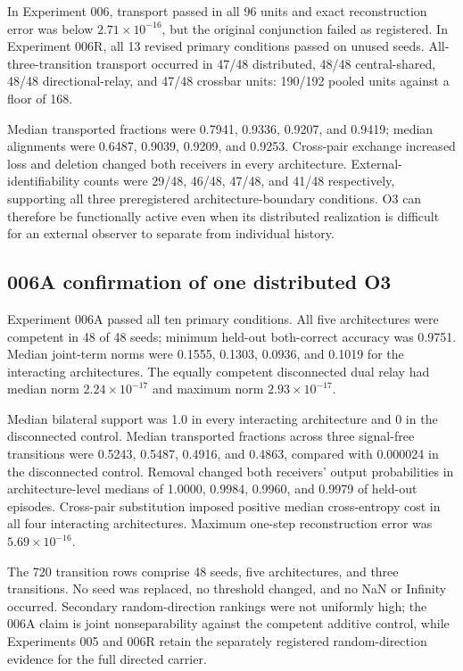 \documentclass[11pt,a4paper]{article}
\begin{document}
In Experiment 006, transport passed in all 96 units and exact reconstruction error was below $2.71\times10^{-16}$, but the original conjunction failed as registered. In Experiment 006R, all 13 revised primary conditions passed on unused seeds. All-three-transition transport occurred in 47/48 distributed, 48/48 central-shared, 48/48 directional-relay, and 47/48 crossbar units: 190/192 pooled units against a floor of 168.

Median transported fractions were 0.7941, 0.9336, 0.9207, and 0.9419; median alignments were 0.6487, 0.9039, 0.9209, and 0.9253. Cross-pair exchange increased loss and deletion changed both receivers in every architecture. External-identifiability counts were 29/48, 46/48, 47/48, and 41/48 respectively, supporting all three preregistered architecture-boundary conditions. O3 can therefore be functionally active even when its distributed realization is difficult for an external observer to separate from individual history.

\subsection{006A confirmation of one distributed O3}

Experiment 006A passed all ten primary conditions. All five architectures were competent in 48 of 48 seeds; minimum held-out both-correct accuracy was 0.9751. Median joint-term norms were 0.1555, 0.1303, 0.0936, and 0.1019 for the interacting architectures. The equally competent disconnected dual relay had median norm $2.24\times10^{-17}$ and maximum norm $2.93\times10^{-17}$.

Median bilateral support was 1.0 in every interacting architecture and 0 in the disconnected control. Median transported fractions across three signal-free transitions were 0.5243, 0.5487, 0.4916, and 0.4863, compared with 0.000024 in the disconnected control. Removal changed both receivers' output probabilities in architecture-level medians of 1.0000, 0.9984, 0.9960, and 0.9979 of held-out episodes. Cross-pair substitution imposed positive median cross-entropy cost in all four interacting architectures. Maximum one-step reconstruction error was $5.69\times10^{-16}$.

The 720 transition rows comprise 48 seeds, five architectures, and three transitions. No seed was replaced, no threshold changed, and no NaN or Infinity occurred. Secondary random-direction rankings were not uniformly high; the 006A claim is joint nonseparability against the competent additive control, while Experiments 005 and 006R retain the separately registered random-direction evidence for the full directed carrier.
\end{document}
